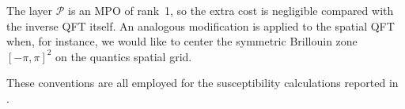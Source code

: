 The layer \(\mathcal P\) is an MPO of rank~1, so the extra cost is negligible
compared with the inverse QFT itself.  An analogous modification is applied
to the spatial QFT when, for instance, we would like to center the symmetric Brillouin zone \([-\pi,\pi]^{2}\) on the quantics spatial grid.

These conventions are all employed for the susceptibility calculations reported in .